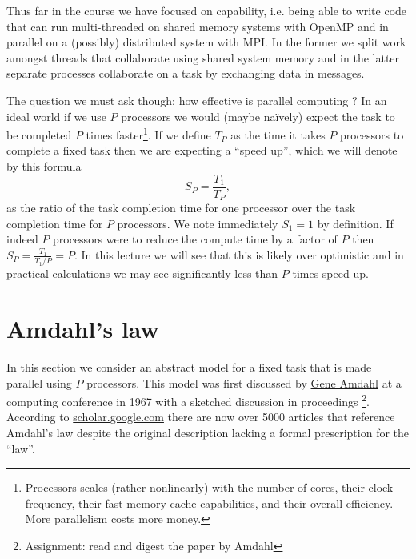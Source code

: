 

Thus far in the course we have focused on capability, i.e. being able to write code that can run multi-threaded on shared memory systems with OpenMP and in parallel on a (possibly) distributed system with MPI. In the former we split work amongst threads that collaborate using shared system memory and in the latter separate processes collaborate on a task by exchanging data in messages. 

The question we must ask though: how effective is parallel computing ? In an ideal world if we use $P$ processors we would (maybe na\"{i}vely) expect the task to be completed $P$ times faster\footnote{Processors scales (rather nonlinearly) with the number of cores, their clock frequency, their fast memory cache capabilities, and their overall efficiency. More parallelism costs more money.}. If we define $T_P$ as the time it takes $P$ processors to complete a fixed task then we are expecting a ``speed up'', which we will denote by this formula
\[
S_P = \frac{T_1}{T_P},
\]
as the ratio of the task completion time for one processor over the task completion time for $P$ processors. We note immediately $S_1=1$ by definition. If indeed $P$ processors were to reduce the compute time by a factor of $P$ then $S_P=\frac{T_1}{T_1/P}=P$. In this lecture we will see that this is likely over optimistic and in practical calculations we may see significantly less than $P$ times speed up. 

\section{Amdahl's law}

In this section we consider an abstract model for a fixed task that is made parallel using $P$ processors. This model was first discussed by \href{https://en.wikipedia.org/wiki/Gene_Amdahl}{Gene Amdahl} at a computing conference in 1967 with a sketched discussion in proceedings \cite{amdahl1967validity}\footnote{Assignment: read and digest the paper by Amdahl}. According to \href{https://scholar.google.com/scholar?hl=en&as_sdt=0%2C47&q=amdahl%27s+law&btnG=}{scholar.google.com} there are now over 5000 articles that reference Amdahl's law despite the original description lacking a formal prescription for the ``law''.  

